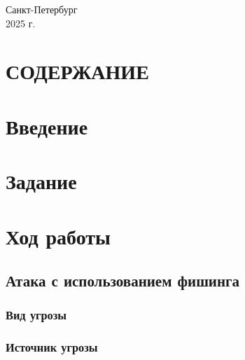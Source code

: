 \documentclass[a4paper,12pt]{article}
\begin{document}
	\vfill
	
	\begin{center}
		Санкт-Петербург \\
		2025 г.
	\end{center}
	
	\newpage
	
	\section*{\label{sec:toc_main}СОДЕРЖАНИЕ} %
	
	\setcounter{page}{2} %
	
	\tableofcontents 
	\newpage
	
	\section*{Введение} %
	\lipsum[1] %
	
	\section*{Задание} %
	\lipsum[2]
	
	\section{Ход работы}
	\subsection{Атака с использованием фишинга}
	\subsubsection{Вид угрозы}
	\lipsum[3]
	
	\subsubsection{Источник угрозы}
	\lipsum[4]
	
\end{document}
